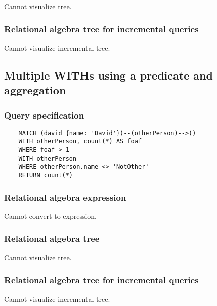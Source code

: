 	Cannot visualize tree.

	\subsubsection*{Relational algebra tree for incremental queries}

	Cannot visualize incremental tree.
	\subsection{Multiple WITHs using a predicate and aggregation}

	\subsubsection*{Query specification}

	\begin{lstlisting}
	MATCH (david {name: 'David'})--(otherPerson)-->()
	WITH otherPerson, count(*) AS foaf
	WHERE foaf > 1
	WITH otherPerson
	WHERE otherPerson.name <> 'NotOther'
	RETURN count(*)
	\end{lstlisting}


	\subsubsection*{Relational algebra expression}

	Cannot convert to expression.

	\subsubsection*{Relational algebra tree}

	Cannot visualize tree.

	\subsubsection*{Relational algebra tree for incremental queries}

	Cannot visualize incremental tree.

